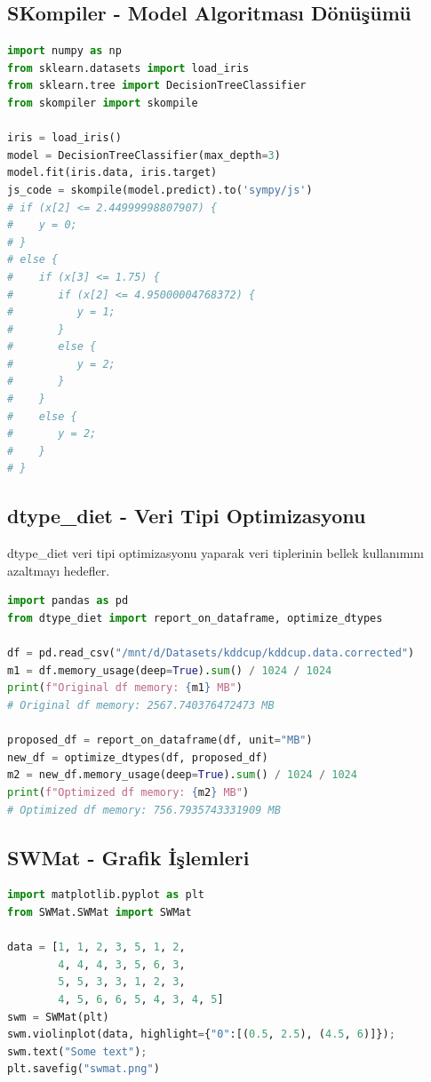 \newpage

\subsection{SKompiler - Model Algoritması Dönüşümü}
\begin{lstlisting}[language=Python]
import numpy as np
from sklearn.datasets import load_iris
from sklearn.tree import DecisionTreeClassifier
from skompiler import skompile

iris = load_iris()
model = DecisionTreeClassifier(max_depth=3)
model.fit(iris.data, iris.target)
js_code = skompile(model.predict).to('sympy/js')
# if (x[2] <= 2.44999998807907) {
#    y = 0;
# }
# else {
#    if (x[3] <= 1.75) {
#       if (x[2] <= 4.95000004768372) {
#          y = 1;
#       }
#       else {
#          y = 2;
#       }
#    }
#    else {
#       y = 2;
#    }
# }
\end{lstlisting}

\subsection{dtype\_diet - Veri Tipi Optimizasyonu}
dtype\_diet veri tipi optimizasyonu yaparak veri tiplerinin bellek kullanımını azaltmayı hedefler.

\begin{lstlisting}[language=Python]
import pandas as pd
from dtype_diet import report_on_dataframe, optimize_dtypes

df = pd.read_csv("/mnt/d/Datasets/kddcup/kddcup.data.corrected")
m1 = df.memory_usage(deep=True).sum() / 1024 / 1024
print(f"Original df memory: {m1} MB")
# Original df memory: 2567.740376472473 MB

proposed_df = report_on_dataframe(df, unit="MB")
new_df = optimize_dtypes(df, proposed_df)
m2 = new_df.memory_usage(deep=True).sum() / 1024 / 1024
print(f"Optimized df memory: {m2} MB")
# Optimized df memory: 756.7935743331909 MB
\end{lstlisting}

\newpage

\subsection{SWMat - Grafik İşlemleri}
\begin{lstlisting}[language=Python]
import matplotlib.pyplot as plt
from SWMat.SWMat import SWMat

data = [1, 1, 2, 3, 5, 1, 2, 
        4, 4, 4, 3, 5, 6, 3, 
        5, 5, 3, 3, 1, 2, 3, 
        4, 5, 6, 6, 5, 4, 3, 4, 5]
swm = SWMat(plt) 
swm.violinplot(data, highlight={"0":[(0.5, 2.5), (4.5, 6)]});
swm.text("Some text");
plt.savefig("swmat.png")
\end{lstlisting}

